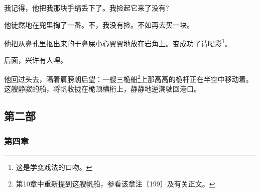 \par 我记得，他把我那块手绢丢下了。我捡起它来了没有?
\par 他徒然地在兜里掏了一番。不，我没有捡。不如再去买一块。
\par 他把从鼻孔里抠出来的干鼻屎小心翼翼地放在岩角上。变成功了请喝彩\footnote{这是学变戏法的口吻。}。
\par 后面，兴许有人哩。
\par 他回过头去，隔着肩膀朝后望：一艘三桅船\footnote{第10章中重新提到这艘帆船，参看该章注〔199〕及有关正文。}上那高高的桅杆正在半空中移动着。这艘静寂的船，将帆收拢在桅顶横桁上，静静地逆潮驶回港口。














\subsection*{第二部}




\subsubsection*{第四章}

